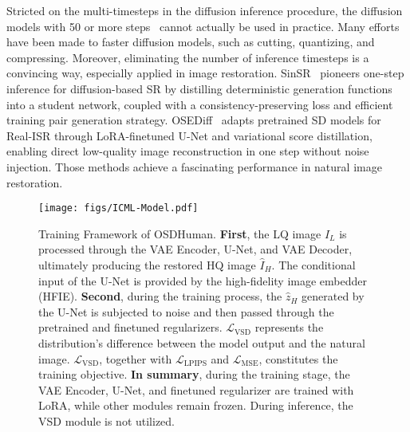 Stricted on the multi-timesteps in the diffusion inference procedure, the diffusion models with 50 or more steps~\cite{wang2024exploiting,lin2024diffbir,wu2024seesr,yang2023pasd} cannot actually be used in practice. Many efforts have been made to faster diffusion models, such as cutting, quantizing, and compressing. Moreover, eliminating the number of inference timesteps is a convincing way, especially applied in image restoration. SinSR~\cite{wang2024sinsr} pioneers one-step inference for diffusion-based SR by distilling deterministic generation functions into a student network, coupled with a consistency-preserving loss and efficient training pair generation strategy. OSEDiff~\cite{wu2024osediff} adapts pretrained SD models for Real-ISR through LoRA-finetuned U-Net and variational score distillation, enabling direct low-quality image reconstruction in one step without noise injection. Those methods achieve a fascinating performance in natural image restoration. 

\begin{figure*}[t]
\begin{center}

\texttt{[image: figs/ICML-Model.pdf]}

\end{center}
\vspace{-5mm}
\caption{Training Framework of OSDHuman. \textbf{First}, the LQ image $I_L$ is processed through the VAE Encoder, U-Net, and VAE Decoder, ultimately producing the restored HQ image $\hat{I}_H$. The conditional input of the U-Net is provided by the high-fidelity image embedder (HFIE). \textbf{Second}, during the training process, the $\hat{z}_H$ generated by the U-Net is subjected to noise and then passed through the pretrained and finetuned regularizers. $\mathcal{L}_{\text{VSD}}$ represents the distribution's difference between the model output and the natural image. $\mathcal{L}_{\text{VSD}}$, together with $\mathcal{L}_{\text{LPIPS}}$ and $\mathcal{L}_{\text{MSE}}$, constitutes the training objective. \textbf{In summary}, during the training stage, the VAE Encoder, U-Net, and finetuned regularizer are trained with LoRA, while other modules remain frozen. During inference, the VSD module is not utilized.
}

\vspace{-5mm}
\label{fig:model_architecture}
\end{figure*}

\vspace{-2mm}